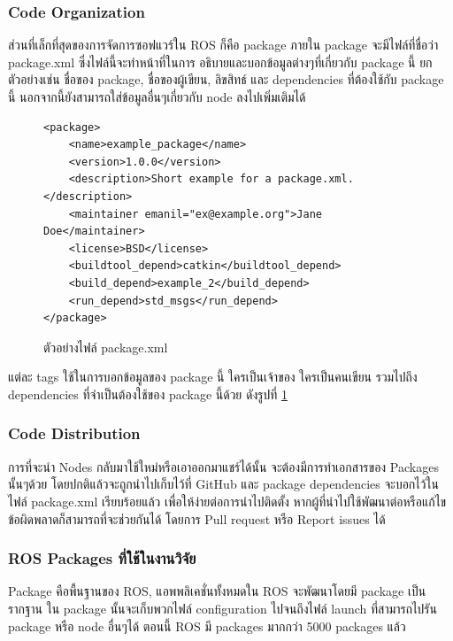 \subsubsection*{Code Organization}
ส่วนที่เล็กที่สุดของการจัดการซอฟแวร์ใน ROS ก็คือ package ภายใน package จะมีไฟล์ที่ชื่อว่า package.xml
ซึ่งไฟล์นี้จะทำหน้าที่ในการ อธิบายและบอกข้อมูลต่างๆที่เกี่ยวกับ package นี้ ยกตัวอย่างเช่น
ชื่อของ package, ชื่อของผู้เขียน, ลิขสิทธ์ และ dependencies ที่ต้องใช้กับ package นี้
นอกจากนี้ยังสามารถใส่ข้อมูลอื่นๆเกี่ยวกับ node ลงไปเพิ่มเติมได้

\begin{figure}[!ht]
	\begin{Verbatim}[fontsize=\small]
<package>
	<name>example_package</name>
	<version>1.0.0</version>
	<description>Short example for a package.xml.</description>
	<maintainer emanil="ex@example.org">Jane Doe</maintainer>
	<license>BSD</license>
	<buildtool_depend>catkin</buildtool_depend>
	<build_depend>example_2</build_depend>
	<run_depend>std_msgs</run_depend>
</package>
	\end{Verbatim}
	\caption{ตัวอย่างไฟล์ package.xml}
    \label{fig:example_packagexml}
\end{figure}

แต่ละ tags ใช้ในการบอกข้อมูลของ package นี้ ใครเป็นเจ้าของ ใครเป็นคนเขียน รวมไปถึง dependencies
ที่จำเป็นต้องใช้ของ package นี้ด้วย ดังรูปที่ \ref{fig:example_packagexml} 

\clearpage
\subsubsection*{Code Distribution}
การที่จะนำ Nodes กลับมาใช้ใหม่หรือเอาออกมาแชร์ได้นั้น จะต้องมีการทำเอกสารของ Packages นั้นๆด้วย
โดยปกติแล้วจะถูกนำไปเก็บไว้ที่ GitHub และ package dependencies จะบอกไว้ในไฟล์ package.xml
เรียบร้อยแล้ว เพื่อให้ง่ายต่อการนำไปติดตั้ง หากผู้ที่นำไปใช้พัฒนาต่อหรือแก้ไขข้อผิดพลาดก็สามารถที่จะช่วยกันได้
โดยการ Pull request หรือ Report issues ได้

\subsubsection*{ROS Packages ที่ใช้ในงานวิจัย}
Package คือพื้นฐานของ ROS, แอพพลิเคชั่นทั้งหมดใน ROS จะพัฒนาโดยมี package เป็นรากฐาน ใน package นั้นจะเก็บพวกไฟล์
configuration ไปจนถึงไฟล์ launch ที่สามารถไปรัน package หรือ node อื่นๆได้ ตอนนี้ ROS มี packages มากกว่า 5000 packages แล้ว

